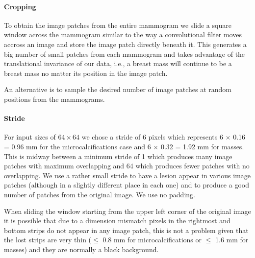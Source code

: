 

\paragraph{Cropping}
To obtain the image patches from the entire mammogram we slide a square window across the mammogram similar to the way a convolutional filter moves accross an image and store the image patch directly beneath it. This generates a big number of small patches from each mammogram and takes advantage of the translational invariance of our data, i.e., a breast mass will continue to be a breast mass no matter its position in the image patch.

An alternative is to sample the desired number of image patches at random positions from the mammograms.

\paragraph{Stride}
For input sizes of $64\times 64$ we chose a stride of 6 pixels which represents 6 $\times$ 0.16 = 0.96 mm for the microcalcifications case and 6 $\times$ 0.32 = 1.92 mm for masses. This is midway between a minimum stride of 1 which produces many image patches with maximum overlapping and 64 which produces fewer patches with no overlapping. We use a rather small stride to have a lesion appear in various image patches (although in a slightly different place in each one) and to produce a good number of patches from the original image. We use no padding.

When sliding the window starting from the upper left corner of the original image it is possible that due to a dimension mismatch pixels in the rightmost and bottom strips do not appear in any image patch, this is not a problem given that the lost strips are very thin ($\leq$ 0.8 mm for microcalcifications or  $\leq$ 1.6 mm for masses) and they are normally a black background.

